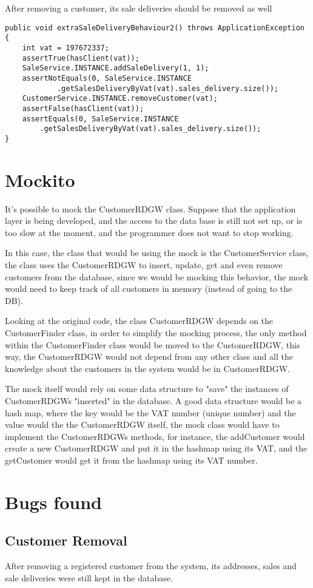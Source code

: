 \documentclass[12pt]{article}
\begin{document}
After removing a customer, its sale deliveries should be removed as well
\begin{lstlisting}
public void extraSaleDeliveryBehaviour2() throws ApplicationException {
	int vat = 197672337;
	assertTrue(hasClient(vat));
	SaleService.INSTANCE.addSaleDelivery(1, 1);
	assertNotEquals(0, SaleService.INSTANCE
			.getSalesDeliveryByVat(vat).sales_delivery.size());
	CustomerService.INSTANCE.removeCustomer(vat);
	assertFalse(hasClient(vat));
	assertEquals(0, SaleService.INSTANCE
		.getSalesDeliveryByVat(vat).sales_delivery.size());
}
\end{lstlisting}

\newpage
\section{Mockito}
It's possible to mock the CustomerRDGW class. Suppose that the application layer is being developed, and the access to the data base is still not set up, or is too slow at the moment, and the programmer does not want to stop working.

In this case, the class that would be using the mock is the CustomerService class, the class uses the CustomerRDGW to insert, update, get and even remove customers from the database, since we would be mocking this behavior, the mock would need to keep track of all customers in memory (instead of going to the DB).

Looking at the original code, the class CustomerRDGW depends on the CustomerFinder class, in order to simplify the mocking process, the only method within the CustomerFinder class would be moved to the CustomerRDGW, this way, the CustomerRDGW would not depend from any other class and all the knowledge about the customers in the system would be in CustomerRDGW.

The mock itself would rely on some data structure to "save" the instances of CustomerRDGWs "inserted" in the database. A good data structure would be a hash map, where the key would be the VAT number (unique number) and the value would the the CustomerRDGW itself, the mock class would have to implement the CustomerRDGWs methods, for instance, the addCustomer would create a new CustomerRDGW and put it in the hashmap using its VAT, and the getCustomer would get it from the hashmap using its VAT number.
\newpage
\section{Bugs found}
\subsection{Customer Removal}
After removing a registered customer from the system, its addresses, sales and sale deliveries were still kept in the database.
\end{document}
